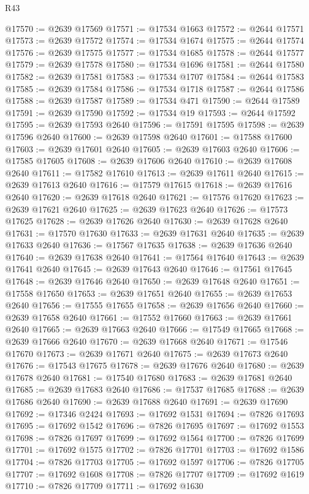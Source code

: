 \begin{lexlean}{R43}
\begin{coremodule}
@17570 := @2639 @17569
@17571 := @17534 @1663
@17572 := @2644 @17571
@17573 := @2639 @17572
@17574 := @17534 @1674
@17575 := @2644 @17574
@17576 := @2639 @17575
@17577 := @17534 @1685
@17578 := @2644 @17577
@17579 := @2639 @17578
@17580 := @17534 @1696
@17581 := @2644 @17580
@17582 := @2639 @17581
@17583 := @17534 @1707
@17584 := @2644 @17583
@17585 := @2639 @17584
@17586 := @17534 @1718
@17587 := @2644 @17586
@17588 := @2639 @17587
@17589 := @17534 @471
@17590 := @2644 @17589
@17591 := @2639 @17590
@17592 := @17534 @19
@17593 := @2644 @17592
@17595 := @2639 @17593 @2640
@17596 := @17591 @17595
@17598 := @2639 @17596 @2640
@17600 := @2639 @17598 @2640
@17601 := @17588 @17600
@17603 := @2639 @17601 @2640
@17605 := @2639 @17603 @2640
@17606 := @17585 @17605
@17608 := @2639 @17606 @2640
@17610 := @2639 @17608 @2640
@17611 := @17582 @17610
@17613 := @2639 @17611 @2640
@17615 := @2639 @17613 @2640
@17616 := @17579 @17615
@17618 := @2639 @17616 @2640
@17620 := @2639 @17618 @2640
@17621 := @17576 @17620
@17623 := @2639 @17621 @2640
@17625 := @2639 @17623 @2640
@17626 := @17573 @17625
@17628 := @2639 @17626 @2640
@17630 := @2639 @17628 @2640
@17631 := @17570 @17630
@17633 := @2639 @17631 @2640
@17635 := @2639 @17633 @2640
@17636 := @17567 @17635
@17638 := @2639 @17636 @2640
@17640 := @2639 @17638 @2640
@17641 := @17564 @17640
@17643 := @2639 @17641 @2640
@17645 := @2639 @17643 @2640
@17646 := @17561 @17645
@17648 := @2639 @17646 @2640
@17650 := @2639 @17648 @2640
@17651 := @17558 @17650
@17653 := @2639 @17651 @2640
@17655 := @2639 @17653 @2640
@17656 := @17555 @17655
@17658 := @2639 @17656 @2640
@17660 := @2639 @17658 @2640
@17661 := @17552 @17660
@17663 := @2639 @17661 @2640
@17665 := @2639 @17663 @2640
@17666 := @17549 @17665
@17668 := @2639 @17666 @2640
@17670 := @2639 @17668 @2640
@17671 := @17546 @17670
@17673 := @2639 @17671 @2640
@17675 := @2639 @17673 @2640
@17676 := @17543 @17675
@17678 := @2639 @17676 @2640
@17680 := @2639 @17678 @2640
@17681 := @17540 @17680
@17683 := @2639 @17681 @2640
@17685 := @2639 @17683 @2640
@17686 := @17537 @17685
@17688 := @2639 @17686 @2640
@17690 := @2639 @17688 @2640
@17691 := @2639 @17690
@17692 := @17346 @2424
@17693 := @17692 @1531
@17694 := @7826 @17693
@17695 := @17692 @1542
@17696 := @7826 @17695
@17697 := @17692 @1553
@17698 := @7826 @17697
@17699 := @17692 @1564
@17700 := @7826 @17699
@17701 := @17692 @1575
@17702 := @7826 @17701
@17703 := @17692 @1586
@17704 := @7826 @17703
@17705 := @17692 @1597
@17706 := @7826 @17705
@17707 := @17692 @1608
@17708 := @7826 @17707
@17709 := @17692 @1619
@17710 := @7826 @17709
@17711 := @17692 @1630

\end{coremodule}
\end{lexlean}
